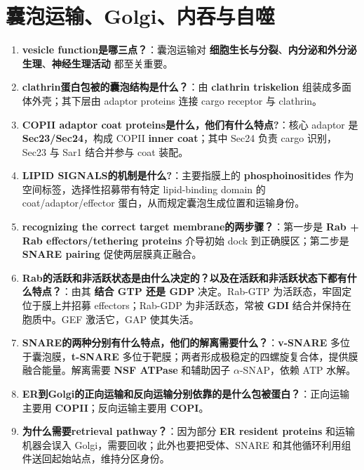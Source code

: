 \documentclass[12pt,fontset=none]{ctexart}
\begin{document}
\section*{囊泡运输、Golgi、内吞与自噬}
\begin{enumerate}
\item \textbf{vesicle function是哪三点？}：囊泡运输对 \textbf{细胞生长与分裂}、\textbf{内分泌和外分泌生理}、\textbf{神经生理活动} 都至关重要。

\item \textbf{clathrin蛋白包被的囊泡结构是什么？}：由 \textbf{clathrin triskelion} 组装成多面体外壳；其下层由 adaptor proteins 连接 cargo receptor 与 clathrin。

\item \textbf{COPII adaptor coat proteins是什么，他们有什么特点?}：核心 adaptor 是 \textbf{Sec23/Sec24}，构成 COPII \textbf{inner coat}；其中 Sec24 负责 cargo 识别，Sec23 与 Sar1 结合并参与 coat 装配。

\item \textbf{LIPID SIGNALS的机制是什么?}：主要指膜上的 \textbf{phosphoinositides} 作为空间标签，选择性招募带有特定 lipid-binding domain 的 coat/adaptor/effector 蛋白，从而规定囊泡生成位置和运输身份。

\item \textbf{recognizing the correct target membrane的两步骤？}：第一步是 \textbf{Rab + Rab effectors/tethering proteins} 介导初始 dock 到正确膜区；第二步是 \textbf{SNARE pairing} 促使两层膜真正融合。

\item \textbf{Rab的活跃和非活跃状态是由什么决定的？以及在活跃和非活跃状态下都有什么特点？}：由其 \textbf{结合 GTP 还是 GDP} 决定。Rab-GTP 为活跃态，牢固定位于膜上并招募 effectors；Rab-GDP 为非活跃态，常被 \textbf{GDI} 结合并保持在胞质中。GEF 激活它，GAP 使其失活。

\item \textbf{SNARE的两种分别有什么特点，他们的解离需要什么？}：\textbf{v-SNARE} 多位于囊泡膜，\textbf{t-SNARE} 多位于靶膜；两者形成极稳定的四螺旋复合体，提供膜融合能量。解离需要 \textbf{NSF ATPase} 和辅助因子 $\alpha$-SNAP，依赖 ATP 水解。

\item \textbf{ER到Golgi的正向运输和反向运输分别依靠的是什么包被蛋白？}：正向运输主要用 \textbf{COPII}；反向运输主要用 \textbf{COPI}。

\item \textbf{为什么需要retrieval pathway？}：因为部分 \textbf{ER resident proteins} 和运输机器会误入 Golgi，需要回收；此外也要把受体、SNARE 和其他循环利用组件送回起始站点，维持分区身份。


\end{enumerate}
\end{document}
